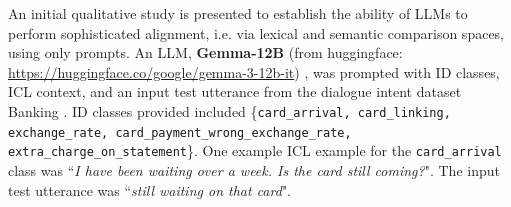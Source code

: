 %
%
An initial qualitative study is presented to establish the ability of LLMs to perform sophisticated alignment, i.e. via lexical and semantic comparison spaces, using only prompts. An LLM, \textbf{Gemma-12B} (from huggingface: \url{https://huggingface.co/google/gemma-3-12b-it}) \citep{team2025gemma}, was prompted with ID classes, ICL context, and an input test utterance from the dialogue intent dataset  Banking \citep{casanueva2020efficient}. ID classes provided included \{\texttt{card\_arrival, card\_linking, exchange\_rate, card\_payment\_wrong\_exchange\_rate, extra\_charge\_on\_statement}\}. One example ICL example for the \texttt{card\_arrival} class was ``\textit{I have been waiting over a week. Is the card still coming?}". The input test utterance was ``\textit{still waiting on that card}".

